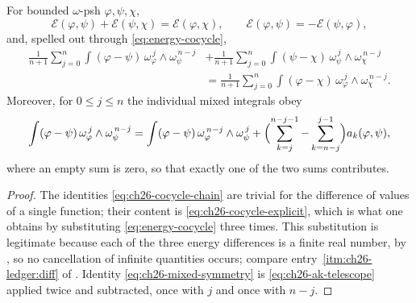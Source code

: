 \begin{proposition}
\label{prop:ch26-cocycle-chain}
For bounded \(\omega\)-psh \(\varphi,\psi,\chi\),
\begin{equation}
\label{eq:ch26-cocycle-chain}
 \mathcal E(\varphi,\psi)+\mathcal E(\psi,\chi)
 =\mathcal E(\varphi,\chi),
 \qquad
 \mathcal E(\varphi,\psi)=-\mathcal E(\psi,\varphi),
\end{equation}
and, spelled out through \eqref{eq:energy-cocycle},
\begin{equation}
\label{eq:ch26-cocycle-explicit}
\begin{aligned}
 \frac1{n+1}\sum_{j=0}^n
  \int(\varphi-\psi)\,\omega_\varphi^{\,j}\wedge\omega_\psi^{\,n-j}
 &+\frac1{n+1}\sum_{j=0}^n
  \int(\psi-\chi)\,\omega_\psi^{\,j}\wedge\omega_\chi^{\,n-j}\\
 &=\frac1{n+1}\sum_{j=0}^n
  \int(\varphi-\chi)\,\omega_\varphi^{\,j}\wedge\omega_\chi^{\,n-j}.
\end{aligned}
\end{equation}
Moreover, for \(0\leq j\leq n\) the individual mixed integrals obey
\begin{equation}
\label{eq:ch26-mixed-symmetry}
 \int(\varphi-\psi)\,\omega_\varphi^{\,j}\wedge\omega_\psi^{\,n-j}
 =\int(\varphi-\psi)\,\omega_\varphi^{\,n-j}\wedge\omega_\psi^{\,j}
 +\Bigl(\sum_{k=j}^{n-j-1}-\sum_{k=n-j}^{j-1}\Bigr)a_k(\varphi,\psi),
\end{equation}
where an empty sum is zero, so that exactly one of the two sums contributes.
\end{proposition}

\begin{proof}
The identities \eqref{eq:ch26-cocycle-chain} are trivial for the difference
of values of a single function; their content is
\eqref{eq:ch26-cocycle-explicit}, which is what one obtains by substituting
\eqref{eq:energy-cocycle} three times.  This substitution is legitimate
because each of the three energy differences is a finite real number, by
, so no cancellation of infinite quantities
occurs; compare entry~\cref{itm:ch26-ledger:diff} of
.  Identity \eqref{eq:ch26-mixed-symmetry} is
\eqref{eq:ch26-ak-telescope} applied twice and subtracted, once with \(j\) and
once with \(n-j\).
\end{proof}

